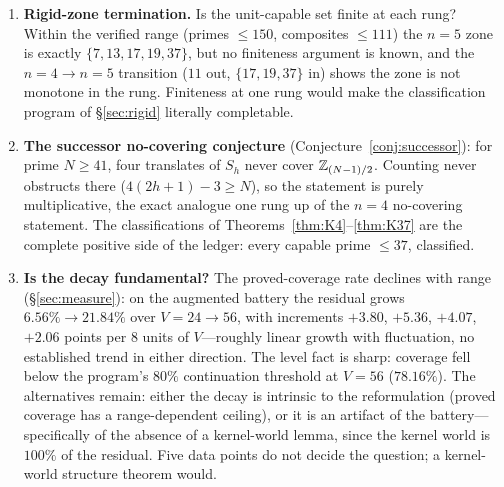 \begin{enumerate}[leftmargin=1.7em,itemsep=4pt]
  three-distance foot count, clean at every prime $p\ge31$ and
  cross-checked against the census to $p\le419$; the two-foot version is
  consumed by no current proof --- leaving the
  pinning-size lemma (relative-offset sets of at most $6$ elements with
  covering counts $28$ and $68$ independent of $p$, verified to
  $p\le113$, needed by the shear-rigidity closure, and now confirmed from
  the $pq$ side by Proposition~\ref{prop:pqpinned}) as the programme's
  single unbounded input, dischargeable not by
  bounded search but by the four-family covering classification
  (Conjecture~\ref{conj:SL}) --- which is the programme's route to an
  unconditional-in-$p$ statement.

\item \textbf{Rigid-zone termination.} Is the unit-capable set finite at
  each rung? Within the verified range (primes $\le 150$, composites
  $\le 111$) the $n=5$ zone is exactly $\{7,13,17,19,37\}$, but no
  finiteness argument is known, and the $n=4\to n=5$ transition
  ($11$ out, $\{17,19,37\}$ in) shows the zone is not monotone in the
  rung. Finiteness at one rung would make the classification program of
  \S\ref{sec:rigid} literally completable.

\item \textbf{The successor no-covering conjecture}
  (Conjecture~\ref{conj:successor}): for prime $N\ge 41$, four
  translates of $S_h$ never cover $\mathbb{Z}_{(N-1)/2}$. Counting never
  obstructs there ($4(2h+1)-3\ge N$), so the statement is purely
  multiplicative, the exact analogue one rung up of the $n=4$
  no-covering statement. The classifications of
  Theorems~\ref{thm:K4}--\ref{thm:K37} are the complete positive side of
  the ledger: every capable prime $\le 37$, classified.

\item \textbf{Is the decay fundamental?} The proved-coverage rate
  declines with range (\S\ref{sec:measure}): on the augmented battery
  the residual grows $6.56\%\to21.84\%$ over $V=24\to56$, with
  increments $+3.80$, $+5.36$, $+4.07$, $+2.06$ points per $8$ units of
  $V$---roughly linear growth with fluctuation, no established trend in
  either direction. The level fact is sharp: coverage fell below the
  program's $80\%$ continuation threshold at $V=56$ ($78.16\%$). The
  alternatives remain: either the decay is intrinsic to the
  reformulation (proved coverage has a range-dependent ceiling), or it
  is an artifact of the battery---specifically of the absence of a
  kernel-world lemma, since the kernel world is $100\%$ of the residual.
  Five data points do not decide the question; a kernel-world structure
  theorem would.


\end{enumerate}
